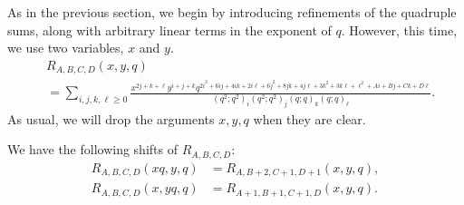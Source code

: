 
As in the previous section, we begin by introducing refinements of the quadruple sums, along with arbitrary linear terms in the exponent of $q$. However, this time, we use two variables, $x$ and $y$.
\begin{align}
\label{eqn:defR}
&R_{A,B,C,D}(x,y,q)\\
&= \sum_{i,j,k,\ell \ge 0}
\frac{x ^{2j + k + \ell } y ^{ i+j+k}q^{2i^2 + 6 ij + 4ik + 2i\ell + 6j^2 + 8 jk + 4 j\ell + 3k^2+3k\ell+\ell^2+Ai+Bj+Ck+D\ell}}
{\left(q^2;q^2\right)_i\left(q^2;q^2\right)_j\left(q;q\right)_k\left(q;q\right)_\ell}. \nonumber
\end{align}
As usual, we will drop the arguments $x,y,q$ when they are clear.

We have the following shifts of $R_{A,B,C,D}$:
\begin{align}
R_{A,B,C,D}(xq,y,q)&=R_{A,B+2,C+1,D+1}(x,y,q) \label{eqn:shiftRx},\\
R_{A,B,C,D}(x,yq,q)&=R_{A+1,B+1,C+1,D}(x,y,q) \label{eqn:shiftRy}.
\end{align}
